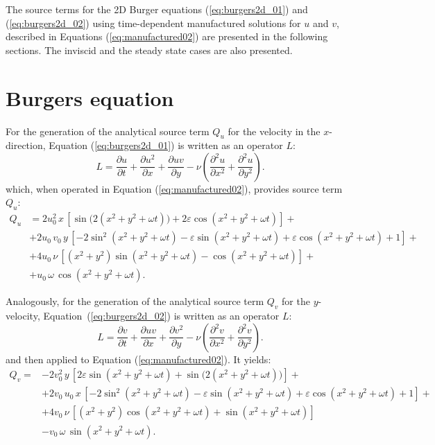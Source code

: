 \documentclass[10pt]{article}
\newcommand{\diff}[2] {\dfrac{\partial #1}{\partial #2}}
\begin{document}
The source terms for the 2D Burger equations (\ref{eq:burgers2d_01}) and (\ref{eq:burgers2d_02}) using time-dependent manufactured solutions  for $u$ and $v$, described in Equations (\ref{eq:manufactured02}) are presented in the following sections. The inviscid and the steady state cases are also presented.


\section{Burgers equation}



For the generation of the analytical source term $Q_u$ for the velocity in the $x$-direction, Equation  (\ref{eq:burgers2d_01}) is written as an  operator $L$:
\begin{equation}
 \label{eq:burgers2d_12}
L=\diff{ u}{t} + \diff{ u^2 }{x}+\diff{uv}{y}-\nu \left( \diff{^2u}{ x^2}+ \diff{^2u }{y^2}\right).
\end{equation}
which, when operated in Equation (\ref{eq:manufactured02}), provides source term $Q_{u}$:
\begin{equation}
\begin{split}\label{sourceQu_complete}
Q_u &= 2 u_0^2 \, x\,[\sin\big(2(x^2+y^2+\omega t)\big)+2 \varepsilon \cos(x^2+y^2+\omega t)] +\\
&+2 u_0 \,v_0\, y\,[-2 \sin^2(x^2+y^2+\omega t)-\varepsilon \sin(x^2+y^2+\omega t)+\varepsilon \cos(x^2+y^2+\omega t)+1] +\\
&+4u_0 \,\nu\,[( x^2 + y^2 )\sin(x^2+y^2+\omega t)- \cos(x^2+y^2+\omega t)]+\\
&+u_0 \,\omega\, \cos(x^2+y^2+\omega t).
\end{split}
 \end{equation}

Analogously, for the generation of the analytical source term $Q_v$ for the $y$-velocity, Equation~(\ref{eq:burgers2d_02}) is written as an  operator $L$:
\begin{equation}
  \label{eq:burgers2d_13}
  L = \diff{ v}{t}+ \diff{ u v}{x} + \diff{  v^2 }{y}-\nu \left( \diff{^2v}{ x^2}+ \diff{^2v }{y^2}\right).
\end{equation}
and then applied to Equation  (\ref{eq:manufactured02}). It yields:
\begin{equation}
\begin{split}
Q_v =& -2 v_0^2 \,y \,[2 \varepsilon \sin(x^2+y^2+\omega t)+\sin\big(2(x^2+y^2+\omega t)\big)]+\\
&+2 v_0 \,u_0 \,x\,[-2 \sin^2(x^2+y^2+\omega t)-\varepsilon \sin(x^2+y^2+\omega t)+\varepsilon \cos(x^2+y^2+\omega t)+1] +\\
&+4 v_0 \,\nu\,[ ( x^2 + y^2 )\cos(x^2+y^2+\omega t)+ \sin(x^2+y^2+\omega t)] \\
&-v_0\, \omega \,\sin(x^2+y^2+\omega t). \end{split}
\end{equation}
\end{document}
